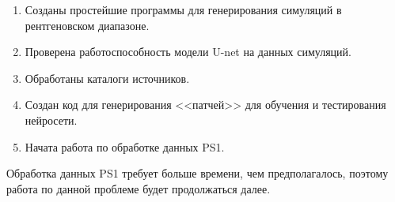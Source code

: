 \documentclass{article}
\begin{document}
\begin{enumerate}
    \item Созданы простейшие программы для генерирования симуляций в рентгеновском диапазоне.
    \item Проверена работоспособность модели U-net на данных симуляций.
    \item Обработаны каталоги источников.
    \item Создан код для генерирования <<патчей>> для обучения и тестирования нейросети.
    \item Начата работа по обработке данных PS1.
\end{enumerate} 

Обработка данных PS1 требует больше времени, чем предполагалось, поэтому работа по данной проблеме 
будет продолжаться далее. \\
\end{document}
